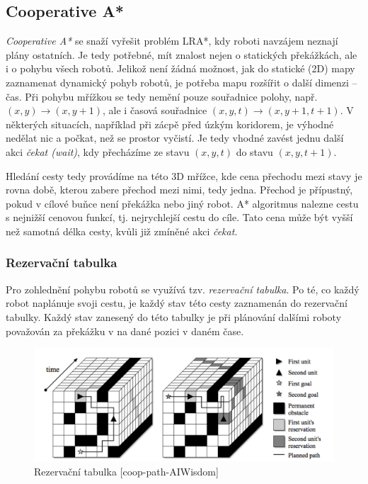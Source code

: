 \subsection{Cooperative A*}\label{sec:Coop}
\emph{Cooperative A*} se snaží vyřešit problém LRA*, kdy roboti navzájem neznají plány ostatních. Je tedy potřebné, mít znalost nejen o statických překážkách, ale i o pohybu všech robotů. Jelikož není žádná možnost, jak do statické (2D) mapy zaznamenat dynamický pohyb robotů, je potřeba mapu rozšířit o další dimenzi -- čas. Při pohybu mřížkou se tedy nemění pouze souřadnice polohy, např. $\left(x,y\right)\to\left(x,y+1\right)$, ale i časová souřadnice $\left(x,y,t\right)\to\left(x,y+1,t+1\right)$. V některých situacích, například při zácpě před úzkým koridorem, je výhodné nedělat nic a počkat, než se prostor vyčistí. Je tedy vhodné zavést jednu další akci \emph{čekat (wait)}, kdy přecházíme ze stavu $\left(x,y,t\right)$ do stavu $\left(x,y,t+1\right)$.

Hledání cesty tedy provádíme na této 3D mřížce, kde cena přechodu mezi stavy je rovna době, kterou zabere přechod mezi nimi, tedy jedna. Přechod je přípustný, pokud v cílové buňce není překážka nebo jiný robot.
A* algoritmus nalezne cestu s nejnižší cenovou funkcí, tj. nejrychlejší cestu do cíle. Tato cena může být vyšší než samotná délka cesty, kvůli již zmíněné akci \emph{čekat}. 

\subsubsection{Rezervační tabulka}\label{sec:reservationTable}

Pro zohlednění pohybu robotů se využívá tzv. \emph{rezervační tabulka}. Po té, co každý robot naplánuje svoji cestu, je každý stav této cesty zaznamenán do rezervační tabulky. Každý stav zanesený do této tabulky je při plánování dalšími roboty považován za překážku v na dané pozici v daném čase. 

\begin{figure}[!h]
	\begin{center}
		\includegraphics*[scale=0.5]{obr/reservationTable}
	\end{center}
	\caption[caption]{Rezervační tabulka [coop-path-AIWisdom]}
	\label{obr:reservationTable}
\end{figure}

